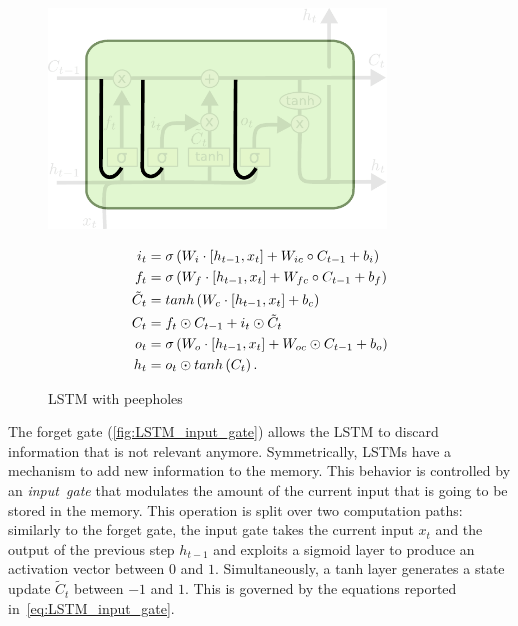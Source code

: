 \begin{figure}[p] %
\begin{minipage}{0.5\textwidth}
    \centering
    \includegraphics[width=0.8\textwidth]{pdf/LSTM_peepholes.pdf}
    \caption{LSTM with peepholes\label{fig:LSTM_peepholes}}
\end{minipage}
\begin{minipage}{0.5\textwidth}
    \setlength\abovedisplayshortskip{0pt}
    \setlength\belowdisplayshortskip{0pt}
    \strut
    \begin{equation}\label{eq:LSTM_peepholes}
    \begin{split}
        i_t &= \sigma\left(W_i \cdot \left[h_{t-1}, x_t\right] +
            W_{ic} \circ C_{t-1} + b_i \right)\\
        f_t &= \sigma\left(W_f \cdot \left[h_{t-1}, x_t\right] +
            W_{fc} \circ C_{t-1} + b_f \right)\\
        \tilde C_t &= tanh \left(W_c \cdot \left[h_{t-1}, x_t\right] +
            b_c \right)\\
        C_t &= f_t \odot C_{t-1} + i_t \odot \tilde C_t\\
        o_t &= \sigma\left(W_o \cdot \left[h_{t-1}, x_t\right] +
            W_{oc} \odot C_{t-1} + b_o \right)\\
        h_t &= o_t \odot tanh \left(C_t\right).
    \end{split}
    \end{equation}
    \strut
\end{minipage}
\end{figure}
The forget gate (\autoref{fig:LSTM_input_gate}) allows the LSTM to discard
information that is not relevant anymore. Symmetrically, LSTMs have a mechanism
to add new information to the memory. This behavior is controlled by an
\emph{input~gate} that modulates the amount of the current input that is going
to be stored in the memory. This operation is split over two computation paths:
similarly to the forget gate, the input gate takes the current input $x_t$ and
the output of the previous step $h_{t-1}$ and exploits a sigmoid layer to
produce an activation vector between $0$ and $1$. Simultaneously, a tanh layer
generates a state update $\tilde C_t$ between $-1$ and $1$. This is governed by
the equations reported in~\autoref{eq:LSTM_input_gate}.

